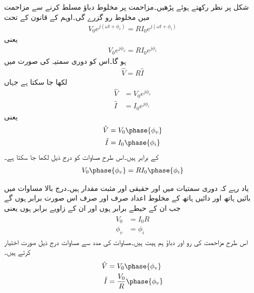 شکل  پر نظر رکھتے ہوئے پڑھیں۔مزاحمت  پر مخلوط دباؤ  مسلط کرنے سے  مزاحمت میں مخلوط رو  گزرے گی۔اوہم کے قانون کے تحت
\begin{align*}
V_0 e^{j(\omega t +\phi_v)}=R I_0 e^{j(\omega t+\phi_i)}
\end{align*}
یعنی
\begin{align*}
V_0 e^{j\phi_v}=R I_0 e^{j\phi_i}
\end{align*}
ہو گا۔اس کو دوری سمتیہ کی صورت میں
\begin{align}\label{مساوات_بدلتا_مزاحمت_دوری_تعلق}
\hat{V}=R \hat{I}
\end{align}
لکھا جا سکتا ہے جہاں
\begin{align*}
\hat{V}&=V_0e^{j\phi_v}\\
\hat{I}&=I_0 e^{j \phi_i}
\end{align*}
یعنی
\begin{gather}
\begin{aligned}\label{مساوات_بدلتا_مزاحمت_دوری_تعلق_الف}
\hat{V}&=V_0 \phase{\phi_v}\\
\hat{I}&=I_0 \phase{\phi_i}
\end{aligned}
\end{gather}
کے برابر ہیں۔اس طرح مساوات  کو درج ذیل لکھا جا سکتا ہے۔
\begin{align*}
V_0 \phase{\phi_v} = R I_0 \phase{\phi_i}
\end{align*}

یاد رہے کہ دوری سمتیات میں  اور  حقیقی اور مثبت مقدار ہیں۔درج بالا مساوات میں بائیں ہاتھ اور دائیں ہاتھ کے مخلوط اعداد صرف اور صرف اس صورت برابر ہوں گے جب ان کے حیطے برابر ہوں اور ان کے زاویے برابر ہوں یعنی
\begin{gather}
\begin{aligned}\label{مساوات_بدلتا_مزاحمت_دوری_تعلق_ب}
V_0&=I_0 R\\
\phi_v&=\phi_i
\end{aligned}
\end{gather} 
اس طرح مزاحمت کی رو اور دباؤ ہم ہیت ہیں۔مساوات  کی مدد سے مساوات  درج ذیل صورت اختیار کرتے ہیں۔
\begin{gather}
\begin{aligned}\label{مساوات_بدلتا_مزاحمت_دوری_تعلق_پ}
\hat{V}&=V_0\phase{\phi_v}\\
\hat{I}&=\frac{V_0}{R} \phase{\phi_v}
\end{aligned}
\end{gather}

